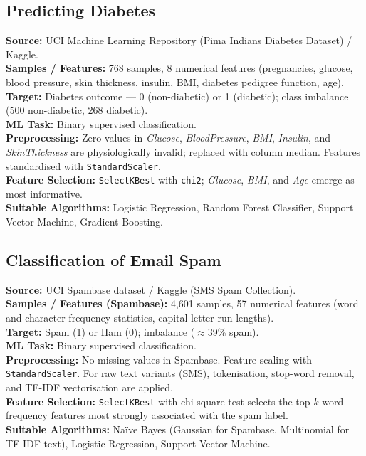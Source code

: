 \documentclass[12pt,a4paper]{article}
\begin{document}
\subsection{Predicting Diabetes}

\textbf{Source:} UCI Machine Learning Repository (Pima Indians Diabetes Dataset) / Kaggle.\\
\textbf{Samples / Features:} 768 samples, 8 numerical features
(pregnancies, glucose, blood pressure, skin thickness, insulin, BMI, diabetes pedigree
function, age).\\
\textbf{Target:} Diabetes outcome --- 0 (non-diabetic) or 1 (diabetic); class imbalance
(500 non-diabetic, 268 diabetic).\\
\textbf{ML Task:} Binary supervised classification.\\
\textbf{Preprocessing:} Zero values in \textit{Glucose}, \textit{BloodPressure},
\textit{BMI}, \textit{Insulin}, and \textit{SkinThickness} are physiologically invalid;
replaced with column median. Features standardised with \texttt{StandardScaler}.\\
\textbf{Feature Selection:} \texttt{SelectKBest} with \texttt{chi2}; \textit{Glucose},
\textit{BMI}, and \textit{Age} emerge as most informative.\\
\textbf{Suitable Algorithms:} Logistic Regression, Random Forest Classifier,
Support Vector Machine, Gradient Boosting.

\subsection{Classification of Email Spam}

\textbf{Source:} UCI Spambase dataset / Kaggle (SMS Spam Collection).\\
\textbf{Samples / Features (Spambase):} 4,601 samples, 57 numerical features
(word and character frequency statistics, capital letter run lengths).\\
\textbf{Target:} Spam (1) or Ham (0); imbalance ($\approx$39\% spam).\\
\textbf{ML Task:} Binary supervised classification.\\
\textbf{Preprocessing:} No missing values in Spambase. Feature scaling with
\texttt{StandardScaler}. For raw text variants (SMS), tokenisation, stop-word removal,
and TF-IDF vectorisation are applied.\\
\textbf{Feature Selection:} \texttt{SelectKBest} with chi-square test selects the top-$k$
word-frequency features most strongly associated with the spam label.\\
\textbf{Suitable Algorithms:} Naïve Bayes (Gaussian for Spambase, Multinomial for
TF-IDF text), Logistic Regression, Support Vector Machine.
\end{document}
